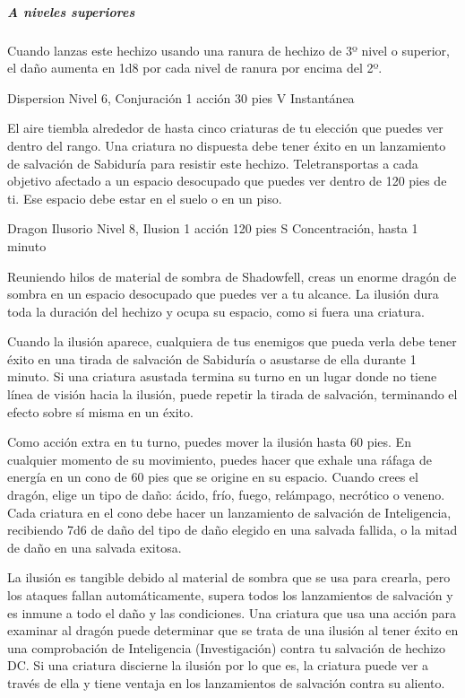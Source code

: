 \documentclass[a4paper,twocolumn,openany,10pt]{dndbook}
\begin{document}
	\subparagraph{A niveles superiores} Cuando lanzas este hechizo usando una ranura de hechizo de 3º nivel o superior, el daño
	aumenta en 1d8 por cada nivel de ranura por encima del 2º. 

\spellheader%
	{Dispersion}
	{Nivel 6, Conjuración}
	{1 acción}
	{30 pies}
	{V}
	{Instantánea}
	
	El aire tiembla alrededor de hasta cinco criaturas de tu elección que puedes ver dentro del rango. Una criatura no dispuesta
	debe tener éxito en un lanzamiento de salvación de Sabiduría para resistir este hechizo. Teletransportas a cada objetivo
	afectado a un espacio desocupado que puedes ver dentro de 120 pies de ti. Ese espacio debe estar en el suelo o en un piso. 

\spellheader%
	{Dragon Ilusorio}
	{Nivel 8, Ilusion}
	{1 acción}
	{120 pies}
	{S}
	{Concentración, hasta 1 minuto}
	
	Reuniendo hilos de material de sombra de Shadowfell, creas un enorme dragón de sombra en un espacio desocupado que puedes
	ver a tu alcance. La ilusión dura toda la duración del hechizo y ocupa su espacio, como si fuera una criatura.
	
	Cuando la ilusión aparece, cualquiera de tus enemigos que pueda verla debe tener éxito en una tirada de salvación de
	Sabiduría o asustarse de ella durante 1 minuto. Si una criatura asustada termina su turno en un lugar donde no tiene línea
	de visión hacia la ilusión, puede repetir la tirada de salvación, terminando el efecto sobre sí misma en un éxito.
	
	Como acción extra en tu turno, puedes mover la ilusión hasta 60 pies. En cualquier momento de su movimiento, puedes hacer
	que exhale una ráfaga de energía en un cono de 60 pies que se origine en su espacio. Cuando crees el dragón, elige un tipo
	de daño: ácido, frío, fuego, relámpago, necrótico o veneno. Cada criatura en el cono debe hacer un lanzamiento de salvación
	de Inteligencia, recibiendo 7d6 de daño del tipo de daño elegido en una salvada fallida, o la mitad de daño en una salvada
	exitosa.
	
	La ilusión es tangible debido al material de sombra que se usa para crearla, pero los ataques fallan automáticamente, supera
	todos los lanzamientos de salvación y es inmune a todo el daño y las condiciones. Una criatura que usa una acción para
	examinar al dragón puede determinar que se trata de una ilusión al tener éxito en una comprobación de Inteligencia
	(Investigación) contra tu salvación de hechizo DC. Si una criatura discierne la ilusión por lo que es, la criatura puede ver
	a través de ella y tiene ventaja en los lanzamientos de salvación contra su aliento. 
\end{document}
